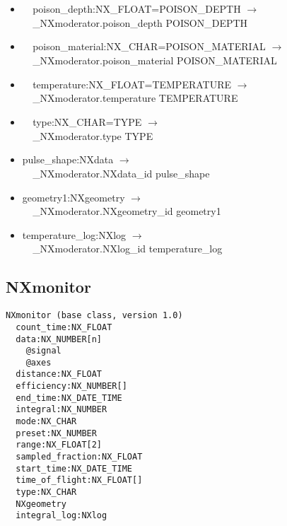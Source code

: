 \documentclass[11pt]{article}
\begin{document}
{{\begin{itemize}
\item{\verb|  |poison\_depth:NX\_FLOAT=POISON\_DEPTH $\rightarrow$\\
\verb|  |\_NXmoderator.poison\_depth POISON\_DEPTH}

\item{\verb|  |poison\_material:NX\_CHAR=POISON\_MATERIAL $\rightarrow$\\
\verb|  |\_NXmoderator.poison\_material POISON\_MATERIAL}

\item{\verb|  |temperature:NX\_FLOAT=TEMPERATURE $\rightarrow$\\
\verb|  |\_NXmoderator.temperature TEMPERATURE}

\item{\verb|  |type:NX\_CHAR=TYPE $\rightarrow$\\
\verb|  |\_NXmoderator.type TYPE}

\item{pulse\_shape:NXdata $\rightarrow$\\
\verb|  |\_NXmoderator.NXdata\_id pulse\_shape}

\item{geometry1:NXgeometry $\rightarrow$\\
\verb|  |\_NXmoderator.NXgeometry\_id geometry1}

\item{temperature\_log:NXlog $\rightarrow$\\
\verb|  |\_NXmoderator.NXlog\_id temperature\_log}
\end{itemize}
\subsection{NXmonitor}

\begin{verbatim}
NXmonitor (base class, version 1.0)
  count_time:NX_FLOAT
  data:NX_NUMBER[n]
    @signal
    @axes
  distance:NX_FLOAT
  efficiency:NX_NUMBER[]
  end_time:NX_DATE_TIME
  integral:NX_NUMBER
  mode:NX_CHAR
  preset:NX_NUMBER
  range:NX_FLOAT[2]
  sampled_fraction:NX_FLOAT
  start_time:NX_DATE_TIME
  time_of_flight:NX_FLOAT[]
  type:NX_CHAR
  NXgeometry
  integral_log:NXlog
\end{verbatim}

\begin{itemize}


\end{itemize}}}
\end{document}
